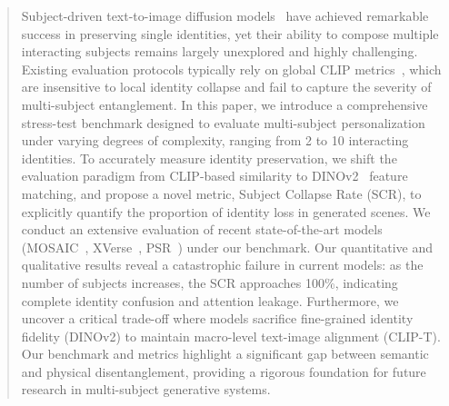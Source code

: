 \begin{abstract}
Subject-driven text-to-image diffusion models~\cite{ruiz2023dreambooth,kumari2023multi} have achieved remarkable success in preserving single identities, yet their ability to compose multiple interacting subjects remains largely unexplored and highly challenging. Existing evaluation protocols typically rely on global CLIP metrics~\cite{radford2021learning}, which are insensitive to local identity collapse and fail to capture the severity of multi-subject entanglement. In this paper, we introduce a comprehensive stress-test benchmark designed to evaluate multi-subject personalization under varying degrees of complexity, ranging from 2 to 10 interacting identities. To accurately measure identity preservation, we shift the evaluation paradigm from CLIP-based similarity to DINOv2~\cite{oquab2023dinov2} feature matching, and propose a novel metric, Subject Collapse Rate (SCR), to explicitly quantify the proportion of identity loss in generated scenes. We conduct an extensive evaluation of recent state-of-the-art models (MOSAIC~\cite{mosaic2024}, XVerse~\cite{xverse2024}, PSR~\cite{psr2024}) under our benchmark. Our quantitative and qualitative results reveal a catastrophic failure in current models: as the number of subjects increases, the SCR approaches 100\%, indicating complete identity confusion and attention leakage. Furthermore, we uncover a critical trade-off where models sacrifice fine-grained identity fidelity (DINOv2) to maintain macro-level text-image alignment (CLIP-T). Our benchmark and metrics highlight a significant gap between semantic and physical disentanglement, providing a rigorous foundation for future research in multi-subject generative systems.
\end{abstract}
